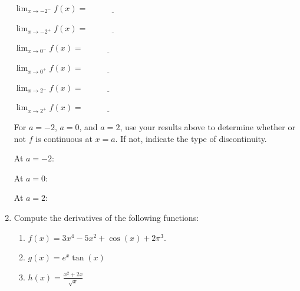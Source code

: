 \documentclass[12pt]{article}
\newcommand{\points}[1]{\marginpar{\hspace{24pt}[#1]}}
\newcommand{\di}{\displaystyle}
\begin{document}
\begin{enumerate}
\begin{vwcol}[widths={0.6,0.4},
 sep=.8cm, justify=flush,rule=0pt,indent=1em]
$\di\lim_{x\to -2^-}f(x) = \underline{\hspace{1in}}$

\bigskip

$\di\lim_{x\to -2^+}f(x) = \underline{\hspace{1in}}$

\bigskip

$\di\lim_{x\to 0^-}f(x) = \underline{\hspace{1in}}$

\bigskip

$\di\lim_{x\to 0^+}f(x) = \underline{\hspace{1in}}$


\bigskip

$\di\lim_{x\to 2^-}f(x) = \underline{\hspace{1in}}$


\bigskip

$\di\lim_{x\to 2^+}f(x) = \underline{\hspace{1in}}$

\end{vwcol}

\medskip

For $a=-2$, $a=0$, and $a=2$, use your results above to determine whether or not $f$ is continuous at $x=a$. If not, indicate the type of discontinuity.

\medskip

At $a=-2$: 

\bigskip

\medskip

At $a=0$:

\bigskip

\medskip

At $a=2$:

\newpage

\item Compute the derivatives of the following functions:
\begin{enumerate}
 \item $\di f(x) = 3x^4-5x^2+\cos(x)+2\pi^3.$ \points{2}

\vspace{1.5in}

 \item $\di g(x) = e^x\tan(x)$ \points{3}

\vspace{1.75in}

 \item $\di h(x) = \frac{x^2+2x}{\sqrt{x}}$ \points{3}

\vspace{2.25in}


\end{enumerate}
\end{enumerate}
\end{document}
